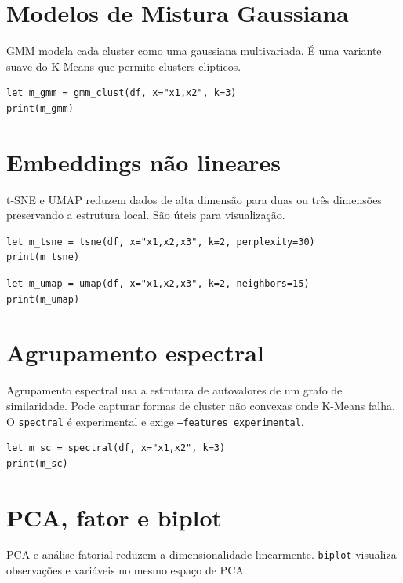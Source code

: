 \section{Modelos de Mistura Gaussiana}

GMM modela cada cluster como uma gaussiana multivariada. É uma variante
suave do K-Means que permite clusters elípticos.

\begin{lstlisting}[caption={Agrupamento por mistura gaussiana}]
let m_gmm = gmm_clust(df, x="x1,x2", k=3)
print(m_gmm)
\end{lstlisting}

\section{Embeddings não lineares}

t-SNE e UMAP reduzem dados de alta dimensão para duas ou três
dimensões preservando a estrutura local. São úteis para visualização.

\begin{lstlisting}[caption={t-SNE}]
let m_tsne = tsne(df, x="x1,x2,x3", k=2, perplexity=30)
print(m_tsne)
\end{lstlisting}

\begin{lstlisting}[caption={UMAP}]
let m_umap = umap(df, x="x1,x2,x3", k=2, neighbors=15)
print(m_umap)
\end{lstlisting}

\section{Agrupamento espectral}

Agrupamento espectral usa a estrutura de autovalores de um grafo de
similaridade. Pode capturar formas de cluster não convexas onde
K-Means falha. O \texttt{spectral} é experimental e exige
\texttt{--features experimental}.

\begin{lstlisting}[caption={Agrupamento espectral}]
let m_sc = spectral(df, x="x1,x2", k=3)
print(m_sc)
\end{lstlisting}

\section{PCA, fator e biplot}

PCA e análise fatorial reduzem a dimensionalidade linearmente. \texttt{biplot}
visualiza observações e variáveis no mesmo espaço de PCA.


